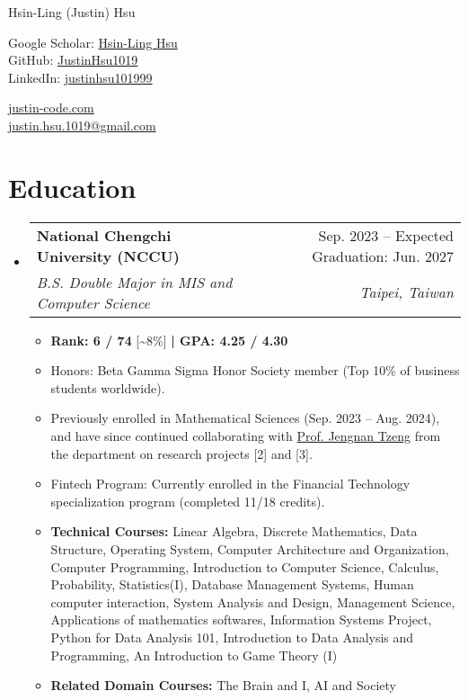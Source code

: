 \documentclass[letterpaper,10pt]{article}
\makeatletter
\newcommand{\resumeItem}[1]{
  \item\small{
    {#1 \vspace{-2pt}}
  }
}
\newcommand{\resumeSubheading}[4]{
  \vspace{-2pt}\item
    \begin{tabular*}{0.97\textwidth}[t]{l@{\extracolsep{\fill}}r}
      \textbf{#1} & #2 \\
      \textit{\small#3} & \textit{\small #4} \\
    \end{tabular*}\vspace{-7pt}
}
\newcommand{\resumeSubHeadingListStart}{\begin{itemize}[leftmargin=0.15in, label={}]}
\newcommand{\resumeSubHeadingListEnd}{\end{itemize}}
\newcommand{\resumeItemListStart}{\begin{itemize}}
\newcommand{\resumeItemListEnd}{\end{itemize}\vspace{-5pt}}
\makeatother
\begin{document}
\begin{center}
    {\LARGE Hsin-Ling (Justin) Hsu} \\ \vspace{2pt}
    \begin{multicols}{2}
    \begin{flushleft}
    Google Scholar: \href{{https://scholar.google.com/citations?user=pCXJM5AAAAAJ}}{Hsin-Ling Hsu} \\ \vspace{1pt}
    GitHub: \href{{https://github.com/justinHsu1019}}{JustinHsu1019}\\ \vspace{1pt}
    LinkedIn: \href{{https://www.linkedin.com/in/justinhsu101999}}{justinhsu101999}
    \end{flushleft}
    \begin{flushright}
    \href{{https://justin-code.com}}{justin-code.com}\\ \vspace{5pt}
    \href{mailto:justin.hsu.1019@gmail.com}{justin.hsu.1019@gmail.com}
    \end{flushright}
    \end{multicols}
\end{center}

\vspace{-15pt}
\section{Education}
  \resumeSubHeadingListStart
      \resumeSubheading
      {National Chengchi University (NCCU)}{Sep. 2023 – Expected Graduation: Jun. 2027}
      {B.S. Double Major in MIS and Computer Science}{Taipei, Taiwan}
      \resumeItemListStart
      \vspace{0.3em}
        \resumeItem{\textbf{Rank: 6 / 74} [\textasciitilde8\%] \textbf{| GPA: 4.25 / 4.30}}
        \resumeItem{Honors: Beta Gamma Sigma Honor Society member (Top 10\% of business students worldwide).}
        \resumeItem{Previously enrolled in Mathematical Sciences (Sep. 2023 -- Aug. 2024), and have since continued collaborating with \href{https://ms.nccu.edu.tw/PageStaffing/Detail?fid=4666\&id=1118}{Prof. Jengnan Tzeng} from the department on research projects [2] and [3].}
        \resumeItem{Fintech Program: Currently enrolled in the Financial Technology specialization program (completed 11/18 credits).}
        \resumeItem{\textbf{Technical Courses:} Linear Algebra, Discrete Mathematics, Data Structure, Operating System, Computer Architecture and Organization, Computer Programming, Introduction to Computer Science, Calculus, Probability, Statistics(I), Database Management Systems, Human computer interaction, System Analysis and Design, Management Science, Applications of mathematics softwares, Information Systems Project, Python for Data Analysis 101, Introduction to Data Analysis and Programming, An Introduction to Game Theory (I)}
        \resumeItem{\textbf{Related Domain Courses:} The Brain and I, AI and Society}
      \resumeItemListEnd
  \resumeSubHeadingListEnd
\end{document}

